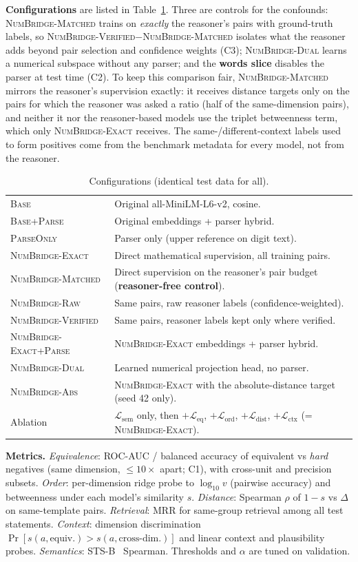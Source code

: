 \documentclass[conference]{IEEEtran}
\newcommand{\Lq}{\mathcal{L}}
\newcommand{\vBase}{\textup{\textsc{Base}}\xspace}                      %
\newcommand{\vParse}{\textup{\textsc{Base+Parse}}\xspace}                %
\newcommand{\vParseOnly}{\textup{\textsc{ParseOnly}}\xspace}             %
\newcommand{\vExact}{\textup{\textsc{NumBridge-Exact}}\xspace}           %
\newcommand{\vMatched}{\textup{\textsc{NumBridge-Matched}}\xspace}       %
\newcommand{\vRaw}{\textup{\textsc{NumBridge-Raw}}\xspace}               %
\newcommand{\vVerified}{\textup{\textsc{NumBridge-Verified}}\xspace}     %
\newcommand{\vExactParse}{\textup{\textsc{NumBridge-Exact+Parse}}\xspace}%
\newcommand{\vDual}{\textup{\textsc{NumBridge-Dual}}\xspace}             %
\newcommand{\vAbs}{\textup{\textsc{NumBridge-Abs}}\xspace}               %
\begin{document}
\textbf{Configurations} are listed in Table~\ref{tab:configs}. Three are controls for the confounds:
\vMatched trains on \emph{exactly} the reasoner's pairs with ground-truth labels, so \vVerified$-$\vMatched isolates what
the reasoner adds beyond pair selection and confidence weights (C3); \vDual learns a numerical subspace without
any parser; and the \textbf{words slice} disables the parser at test time (C2). To keep this comparison fair, \vMatched mirrors the reasoner's supervision exactly: it receives distance targets only on the pairs for which the reasoner was asked a ratio (half of the same-dimension pairs), and neither it nor the reasoner-based models use the triplet betweenness term, which only \vExact receives. The same-/different-context labels used to form positives come from the benchmark metadata for every model, not from the reasoner.

\begin{table}[t]
\centering\footnotesize
\caption{Configurations (identical test data for all).}
\label{tab:configs}
\begin{tabular}{@{}l>{\raggedright\arraybackslash}p{4.4cm}@{}}
\toprule
\vBase & Original all-MiniLM-L6-v2, cosine. \\
\vParse & Original embeddings + parser hybrid. \\
\vParseOnly & Parser only (upper reference on digit text). \\
\vExact & Direct mathematical supervision, all training pairs. \\
\vMatched & Direct supervision on the reasoner's pair budget (\textbf{reasoner-free control}). \\
\vRaw & Same pairs, raw reasoner labels (confidence-weighted). \\
\vVerified & Same pairs, reasoner labels kept only where verified. \\
\vExactParse & \vExact embeddings + parser hybrid. \\
\vDual & Learned numerical projection head, no parser. \\
\vAbs & \vExact with the absolute-distance target (seed 42 only). \\
Ablation & $\Lq_{\mathrm{sem}}$ only, then $+\Lq_{\mathrm{eq}}$, $+\Lq_{\mathrm{ord}}$, $+\Lq_{\mathrm{dist}}$, $+\Lq_{\mathrm{ctx}}$ (= \vExact). \\
\bottomrule
\end{tabular}
\end{table}

\textbf{Metrics.} \emph{Equivalence}: ROC-AUC / balanced accuracy of equivalent vs \emph{hard} negatives (same
dimension, $\le10\times$ apart; C1), with cross-unit and precision subsets. \emph{Order}: per-dimension ridge probe to
$\log_{10}v$ (pairwise accuracy) and betweenness under each model's similarity $s$. \emph{Distance}: Spearman $\rho$ of $1-s$ vs $\Delta$ on
same-template pairs. \emph{Retrieval}: MRR for same-group retrieval among all test statements. \emph{Context}:
dimension discrimination $\Pr[s(a,\text{equiv.})>s(a,\text{cross-dim.})]$ and linear context and plausibility probes.
\emph{Semantics}: STS-B~\cite{cer2017sts} Spearman. Thresholds and $\alpha$ are tuned on validation.
\end{document}
